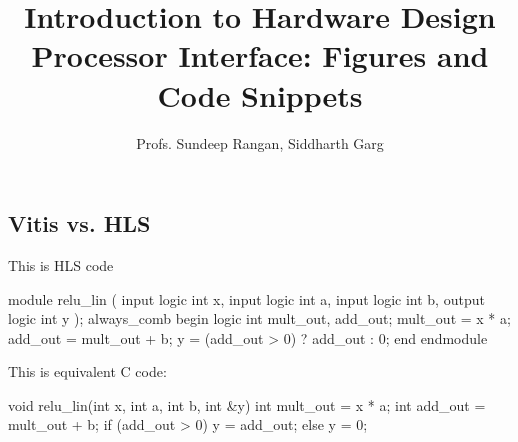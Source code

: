 \documentclass[11pt]{article}
\begin{document}
\title{Introduction to Hardware Design\\
Processor Interface:  Figures and Code Snippets}
\author{Profs. Sundeep Rangan, Siddharth Garg}
\date{}

\maketitle
\subsection{Vitis vs. HLS}

This is HLS code
\begin{systemverilogcode}
    module relu_lin (
      input logic int x,
      input logic int a,
      input logic int b,
      output logic int y
    );
      always_comb begin
        logic int mult_out, add_out;
        mult_out = x * a;
        add_out = mult_out + b;
        y = (add_out > 0) ? add_out : 0;
      end
    endmodule
  \end{systemverilogcode}

  This is equivalent C code:
  \begin{ccode}
    void relu_lin(int x, int a, int b, int &y) {
      int mult_out = x * a;
      int add_out = mult_out + b;
      if (add_out > 0) {
        y = add_out;
      } else {
        y = 0;
      }
    }
  \end{ccode}


  
\end{document}
